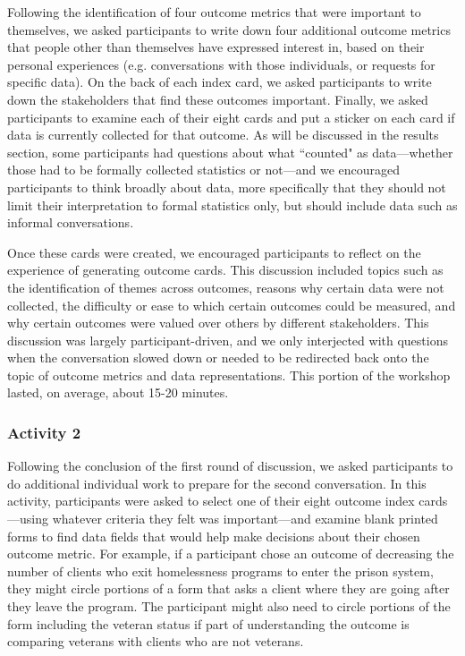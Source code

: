 Following the identification of four outcome metrics that were important to themselves, we asked participants to write down four additional outcome metrics that people other than themselves have expressed interest in, based on their personal experiences (e.g. conversations with those individuals, or requests for specific data). On the back of each index card, we asked participants to write down the stakeholders that find these outcomes important. Finally, we asked participants to examine each of their eight cards and put a sticker on each card if data is currently collected for that outcome. As will be discussed in the results section, some participants had questions about what ``counted" as data---whether those had to be formally collected statistics or not---and we encouraged participants to think broadly about data, more specifically that they should not limit their interpretation to formal statistics only, but should include data such as informal conversations.

Once these cards were created, we encouraged participants to reflect on the experience of generating outcome cards. This discussion included topics such as the identification of themes across outcomes, reasons why certain data were not collected, the difficulty or ease to which certain outcomes could be measured, and why certain outcomes were valued over others by different stakeholders. This discussion was largely participant-driven, and we only interjected with questions when the conversation slowed down or needed to be redirected back onto the topic of outcome metrics and data representations. This portion of the workshop lasted, on average, about 15-20 minutes.

\subsubsection{Activity 2}
Following the conclusion of the first round of discussion, we asked participants to do additional individual work to prepare for the second conversation. In this activity, participants were asked to select one of their eight outcome index cards---using whatever criteria they felt was important---and examine blank printed forms to find data fields that would help make decisions about their chosen outcome metric. For example, if a participant chose an outcome of decreasing the number of clients who exit homelessness programs to enter the prison system, they might circle portions of a form that asks a client where they are going after they leave the program. The participant might also need to circle portions of the form including the veteran status if part of understanding the outcome is comparing veterans with clients who are not veterans.

